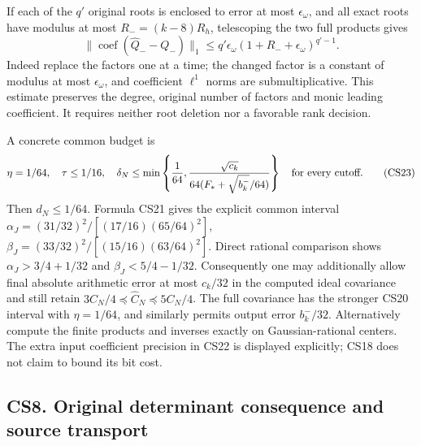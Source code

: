 \documentclass[11pt]{article}
\begin{document}
If each of the \(q'\) original roots is enclosed to error at most \(\epsilon_\omega\), and all exact roots have modulus at most \(R_-= (k-8)R_h\), telescoping the two full products gives \[
 \|\operatorname{coef}(\widehat Q_--Q_-)\|_1
 \le q'\epsilon_\omega(1+R_-+\epsilon_\omega)^{q'-1}.
\] Indeed replace the factors one at a time; the changed factor is a constant of modulus at most \(\epsilon_\omega\), and coefficient \(\ell^1\) norms are submultiplicative. This estimate preserves the degree, original number of factors and monic leading coefficient. It requires neither root deletion nor a favorable rank decision.

A concrete common budget is \[
 \eta=1/64,\quad\tau\le1/16,\quad
 \delta_N\le\min\left\{\frac1{64},\frac{\sqrt{c_k}}{64(F_*+\sqrt{b_k^-}/64)}\right\}
 \quad\hbox{for every cutoff}.
 \tag{CS23}
\] Then \(d_N\le1/64\). Formula CS21 gives the explicit common interval \(\alpha_J=(31/32)^2/[(17/16)(65/64)^2]\), \(\beta_J=(33/32)^2/[(15/16)(63/64)^2]\). Direct rational comparison shows \(\alpha_J>3/4+1/32\) and \(\beta_J<5/4-1/32\). Consequently one may additionally allow final absolute arithmetic error at most \(c_k/32\) in the computed ideal covariance and still retain \(3C_N/4\preceq\widehat C_N\preceq5C_N/4\). The full covariance has the stronger CS20 interval with \(\eta=1/64\), and similarly permits output error \(b_k^-/32\). Alternatively compute the finite products and inverses exactly on Gaussian-rational centers. The extra input coefficient precision in CS22 is displayed explicitly; CS18 does not claim to bound its bit cost.

\subsection{CS8. Original determinant consequence and source transport}\label{cs8.-original-determinant-consequence-and-source-transport}
\end{document}
